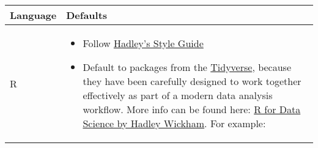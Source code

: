 \documentclass[]{book}
\providecommand{\tightlist}{%
  \setlength{\itemsep}{0pt}\setlength{\parskip}{0pt}}
\begin{document}
\begin{longtable}[]{@{}ll@{}}
\toprule
\begin{minipage}[b]{0.27\columnwidth}\raggedright
Language\strut
\end{minipage} & \begin{minipage}[b]{0.67\columnwidth}\raggedright
Defaults\strut
\end{minipage}\tabularnewline
\midrule
\endhead
\begin{minipage}[t]{0.27\columnwidth}\raggedright
R\strut
\end{minipage} & \begin{minipage}[t]{0.67\columnwidth}\raggedright
\begin{itemize}
\tightlist
\item
  Follow \href{http://adv-r.had.co.nz/Style.html}{Hadley's Style Guide}
\item
  Default to packages from the \href{http://tidyverse.org/}{Tidyverse}, because they have been carefully designed to work together effectively as part of a modern data analysis workflow. More info can be found here: \href{http://r4ds.had.co.nz}{R for Data Science by Hadley Wickham}. For example:


\end{itemize}
\end{minipage}
\end{longtable}
\end{document}
